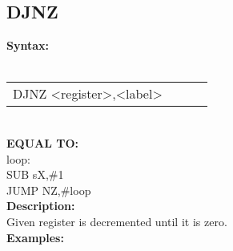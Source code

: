                 \subsection{DJNZ}
                \textbf{Syntax:}\\
                \\ {
                    \texttt{}
                    \begin{tabular}[h!]{llll}
                            { \color{highlight_instruction} DJNZ    } { \color{highlight_symbol} <register>,<label> }
                            { \color{highlight_comment}  }\\
                    \end{tabular}
                    }\\
                    \textbf{EQUAL TO:}\\
                    { \color{highlight_label} loop:    } { \color{highlight_symbol}       }\\
                    { \color{highlight_instruction} SUB    } { \color{highlight_symbol}      sX,\#1 }\\
                    { \color{highlight_instruction} JUMP    } { \color{highlight_symbol}     NZ,\#loop }\\
                \textbf{Description:}\\
                Given register is decremented until it is zero.\\
                \textbf{Examples:}\\
                        \begin{code}[h!]
                        symbol}\verb'loop:          ' }\\
                        symbol}\verb'DJNZ          s0,loop' }\\
                        \end{code}

